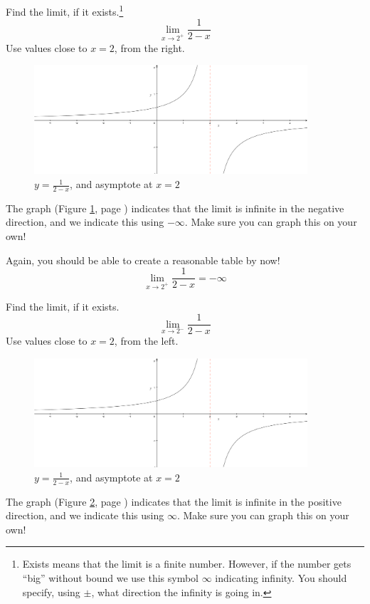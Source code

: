 \documentclass[12pt,addpoints, answers, fleqn]{exam}
\begin{document}
\begin{questions}
\question Find the limit, if it exists.\footnote{Exists means that the limit is a finite number. However, if the number gets ``big'' without bound we use this symbol $\infty$ indicating infinity. You should specify, using $\pm$, what direction the infinity is going in.}
\[
\mathop {\lim }\limits_{x \to 2^+ } \frac{1}{2-x}
\]
Use values close to $x=2$, from the right.
\begin{figure}[htbp] %
   \centering
   \includegraphics[width=4in]{./graphics/graph020108.pdf} 
   \caption{$\displaystyle y = \frac{1}{2-x}$, and asymptote at $x=2$}
   \label{fig:graph020108}
\end{figure}
\begin{solution}
The graph (Figure \ref{fig:graph020108}, page \pageref{fig:graph020108}) indicates that the limit is infinite in the negative direction, and we indicate this using $- \infty$. Make sure you can graph this on your own!

Again, you should be able to create a reasonable table by now!
\[
\mathop {\lim }\limits_{x \to 2^+ } \frac{1}{2-x} = -\infty
\]
\end{solution}


\question Find the limit, if it exists.
\[
\mathop {\lim }\limits_{x \to 2^- } \frac{1}{2-x}
\]
Use values close to $x=2$, from the left.
\begin{figure}[htbp] %
   \centering
   \includegraphics[width=4in]{./graphics/graph020108.pdf} 
   \caption{$\displaystyle y = \frac{1}{2-x}$, and asymptote at $x=2$}
   \label{fig:graph020109}
\end{figure}
\begin{solution}
The graph (Figure \ref{fig:graph020109}, page \pageref{fig:graph020109}) indicates that the limit is infinite in the positive direction, and we indicate this using $ \infty$. Make sure you can graph this on your own!


\end{solution}
\end{questions}
\end{document}
